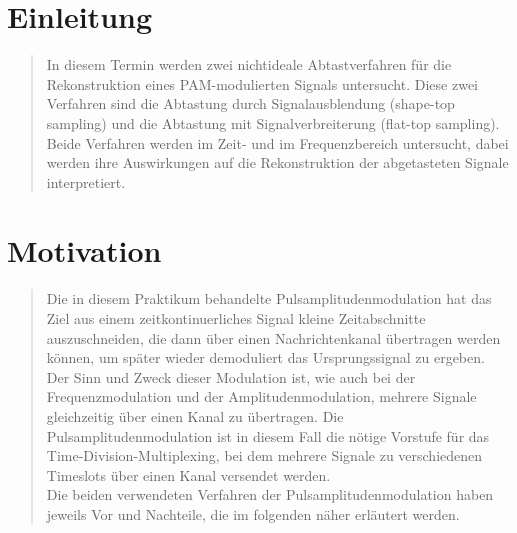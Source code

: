 \section{Einleitung}
\begin{quote}
	
	In diesem Termin werden zwei nichtideale Abtastverfahren für die
	Rekonstruktion eines PAM-modulierten Signals untersucht. Diese zwei Verfahren
	sind die Abtastung durch Signalausblendung (shape-top sampling) und die
	Abtastung mit Signalverbreiterung (flat-top sampling). Beide Verfahren werden
	im Zeit- und im Frequenzbereich untersucht, dabei werden ihre Auswirkungen auf
	die Rekonstruktion der abgetasteten Signale interpretiert.

\end{quote}%

\section{Motivation}
\begin{quote}
	Die in diesem Praktikum behandelte Pulsamplitudenmodulation hat das Ziel aus
	einem zeitkontinuerliches Signal kleine Zeitabschnitte auszuschneiden, die dann über einen Nachrichtenkanal übertragen
	werden können, um später wieder demoduliert das Ursprungssignal zu ergeben. Der
	Sinn und Zweck dieser Modulation ist, wie auch bei der Frequenzmodulation und der Amplitudenmodulation, 
	mehrere Signale gleichzeitig über einen Kanal zu übertragen. Die Pulsamplitudenmodulation ist in
	diesem Fall die nötige Vorstufe für das Time-Division-Multiplexing, bei dem
	mehrere Signale zu verschiedenen Timeslots über einen Kanal versendet werden.\\
	Die beiden verwendeten Verfahren der Pulsamplitudenmodulation haben jeweils Vor und Nachteile, die im folgenden näher
	erläutert werden.
\end{quote} %



